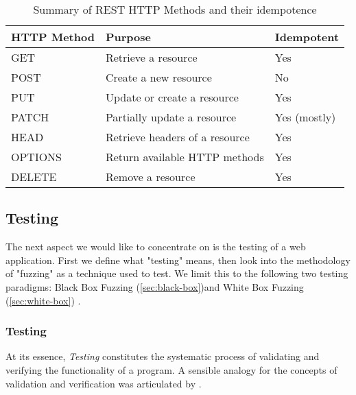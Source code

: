 \begin{table}[htb]
    \centering
    \begin{tabular}{@{}lll@{}}
        \toprule
        \textbf{HTTP Method} & \textbf{Purpose}                         & \textbf{Idempotent} \\ \midrule
        GET                   & Retrieve a resource                     & Yes                 \\
        POST                  & Create a new resource                   & No                  \\
        PUT                   & Update or create a resource             & Yes                 \\
        PATCH                 & Partially update a resource             & Yes (mostly)        \\
        HEAD                  & Retrieve headers of a resource         & Yes                 \\
        OPTIONS               & Return available HTTP methods           & Yes                 \\
        DELETE                & Remove a resource                       & Yes                 \\ \bottomrule
    \end{tabular}
    \caption{Summary of REST HTTP Methods and their idempotence \cite[chapter 9]{fielding_http_2022}}
    \label{tab:rest_http_methods}
\end{table}
\FloatBarrier
\subsection{Testing}
\label{sec:testing}

The next aspect we would like to concentrate on is the testing of a web application. First we define what "testing" means, then look into the methodology of "fuzzing" as a technique used to test. We limit this to the following two testing paradigms:
Black Box Fuzzing (\autoref{sec:black-box})and White Box Fuzzing (\autoref{sec:white-box}) .

\subsubsection{Testing}
At its essence, \textit{Testing} constitutes the systematic process of validating and verifying the functionality of a program. A sensible analogy for the concepts of validation and verification was articulated by \citet{b_w_boehm_verifying_1984}. 

